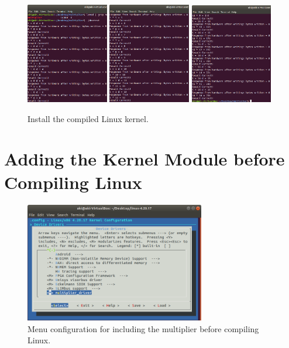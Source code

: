 \documentclass[11pt,letterpaper,titlepage]{article}
\begin{document}
\begin{figure}[ht]
    \centering
    \includegraphics[width=0.32\textwidth]{8.devtest 1.png}
    \includegraphics[width=0.32\textwidth]{9.devtest 2.png}
    \includegraphics[width=0.32\textwidth]{10.devtest 3.png}
    \caption{Install the compiled Linux kernel.}
\end{figure}

\section{Adding the Kernel Module before Compiling Linux}

\begin{figure}[ht]
    \centering
    \includegraphics[width=0.7\textwidth]{11.menuconfig multiplier driver.png}
    \caption{Menu configuration for including the multiplier before compiling Linux.}
\end{figure}
\end{document}
